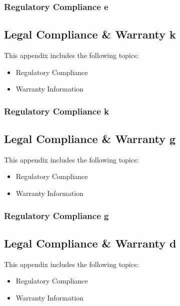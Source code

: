 \documentclass[letterpaper,10pt,openany,oneside,english]{sphinxmanual}
\begin{document}
\subsubsection{Regulatory Compliance e}
\label{\detokenize{partners:regulatory-compliance-e}}

\subsection{Legal Compliance \& Warranty k}
\label{\detokenize{datasharing:legal-compliance-warranty-k}}\label{\detokenize{datasharing::doc}}
This appendix includes the following topics:
\begin{itemize}
\item {} 
Regulatory Compliance

\item {} 
Warranty Information

\end{itemize}


\subsubsection{Regulatory Compliance k}
\label{\detokenize{datasharing:regulatory-compliance-k}}

\subsection{Legal Compliance \& Warranty g}
\label{\detokenize{marketing:legal-compliance-warranty-g}}\label{\detokenize{marketing::doc}}
This appendix includes the following topics:
\begin{itemize}
\item {} 
Regulatory Compliance

\item {} 
Warranty Information

\end{itemize}


\subsubsection{Regulatory Compliance g}
\label{\detokenize{marketing:regulatory-compliance-g}}

\subsection{Legal Compliance \& Warranty d}
\label{\detokenize{team:legal-compliance-warranty-d}}\label{\detokenize{team::doc}}
This appendix includes the following topics:
\begin{itemize}
\item {} 
Regulatory Compliance

\item {} 
Warranty Information

\end{itemize}
\end{document}
